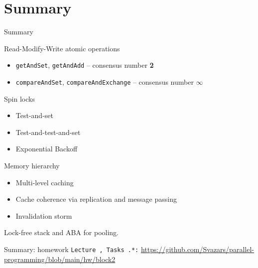 \section{Summary}

\begin{frame}{Summary}

Read-Modify-Write atomic operations
\begin{itemize}
 \item \texttt{getAndSet}, \texttt{getAndAdd} -- consensus number \textbf{2}
 \item \texttt{compareAndSet}, \texttt{compareAndExchange} -- consensus number $\infty$
\end{itemize}

Spin locks
\begin{itemize}
  \item Test-and-set
  \item Test-and-test-and-set
  \item Exponential Backoff
\end{itemize}

Memory hierarchy
\begin{itemize}
  \item Multi-level caching
  \item Cache coherence via replication and message passing
  \item Invalidation storm  
\end{itemize}

Lock-free stack and ABA for pooling.

\end{frame}

\begin{frame}{Summary: homework}
  \texttt{Lecture \thisLectureNum, Tasks \thisLectureNum.*:} {\tiny\url{https://github.com/Svazars/parallel-programming/blob/main/hw/block2}}
\end{frame}


% 
% 
% 
% 
% 


